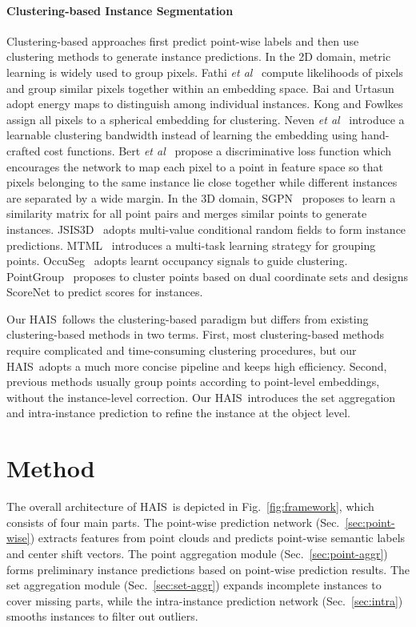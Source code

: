 \documentclass[10pt,twocolumn,letterpaper]{article}
\newcommand{\thename}{HAIS}
\def\etal{\emph{et al}\onedot}
\begin{document}
\paragraph{Clustering-based Instance Segmentation}
Clustering-based approaches first predict point-wise labels and then use clustering methods to generate instance predictions.
In the 2D domain, metric learning is widely used to group pixels.
Fathi \etal~\cite{FathiWRWSGM17} compute likelihoods of pixels and group similar pixels together within an embedding space.
Bai and Urtasun~\cite{BaiU17}  adopt energy maps to distinguish among individual instances.
Kong and Fowlkes~\cite{KongF18a} assign all pixels to a spherical embedding for clustering. 
Neven \etal~\cite{NevenBPG19} introduce a learnable clustering bandwidth instead of learning the embedding using hand-crafted cost functions.
Bert \etal~\cite{Bert2017} propose a discriminative loss function which encourages the network to map each pixel to a point in feature space so that pixels belonging to the same instance lie close together while different instances are separated by a wide margin. 
In the 3D domain, SGPN~\cite{SGPN} proposes to learn a similarity matrix for all point pairs and merges similar points to generate instances.
JSIS3D~\cite{JSIS3D} adopts multi-value conditional random fields to form instance predictions.
MTML~\cite{MTML} introduces a multi-task learning strategy for grouping points.
OccuSeg~\cite{OccuSeg} adopts learnt occupancy signals to guide clustering.
PointGroup~\cite{PointGroup} proposes to cluster points based on dual coordinate sets and designs ScoreNet to predict scores for instances.

Our \thename\ follows the clustering-based paradigm but differs from existing clustering-based methods in two terms.
First, most clustering-based methods require complicated and time-consuming clustering procedures, but our \thename\ adopts a much more concise pipeline and keeps high efficiency.
Second, previous methods usually group points according to point-level embeddings, without the instance-level correction.
Our \thename\ introduces the set aggregation and intra-instance prediction to refine the instance at the object level. 


\section{Method}
The overall architecture of \thename\ is depicted in Fig.~\ref{fig:framework}, which consists of four main parts. The point-wise prediction network (Sec.~\ref{sec:point-wise}) extracts features from point clouds and predicts point-wise semantic labels and center shift vectors. The point aggregation module (Sec.~\ref{sec:point-aggr}) forms preliminary instance predictions based on point-wise prediction results. The set aggregation module (Sec.~\ref{sec:set-aggr}) expands incomplete instances to cover missing parts, while the intra-instance prediction network (Sec.~\ref{sec:intra}) smooths instances to filter out outliers.
\end{document}
